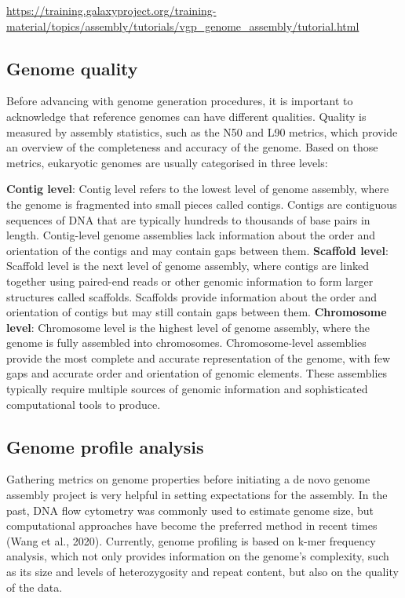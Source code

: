 \documentclass[
]{book}
\begin{document}
\url{https://training.galaxyproject.org/training-material/topics/assembly/tutorials/vgp_genome_assembly/tutorial.html}

\hypertarget{host-genome-quality}{%
\subsection{Genome quality}\label{host-genome-quality}}

Before advancing with genome generation procedures, it is important to acknowledge that reference genomes can have different qualities. Quality is measured by assembly statistics, such as the N50 and L90 metrics, which provide an overview of the completeness and accuracy of the genome. Based on those metrics, eukaryotic genomes are usually categorised in three levels:

\textbf{Contig level}: Contig level refers to the lowest level of genome assembly, where the genome is fragmented into small pieces called contigs. Contigs are contiguous sequences of DNA that are typically hundreds to thousands of base pairs in length. Contig-level genome assemblies lack information about the order and orientation of the contigs and may contain gaps between them.
\textbf{Scaffold level}: Scaffold level is the next level of genome assembly, where contigs are linked together using paired-end reads or other genomic information to form larger structures called scaffolds. Scaffolds provide information about the order and orientation of contigs but may still contain gaps between them.
\textbf{Chromosome level}: Chromosome level is the highest level of genome assembly, where the genome is fully assembled into chromosomes. Chromosome-level assemblies provide the most complete and accurate representation of the genome, with few gaps and accurate order and orientation of genomic elements. These assemblies typically require multiple sources of genomic information and sophisticated computational tools to produce.

\hypertarget{host-genome-profile-analysis}{%
\subsection{Genome profile analysis}\label{host-genome-profile-analysis}}

Gathering metrics on genome properties before initiating a de novo genome assembly project is very helpful in setting expectations for the assembly. In the past, DNA flow cytometry was commonly used to estimate genome size, but computational approaches have become the preferred method in recent times (Wang et al., 2020). Currently, genome profiling is based on k-mer frequency analysis, which not only provides information on the genome's complexity, such as its size and levels of heterozygosity and repeat content, but also on the quality of the data.
\end{document}
